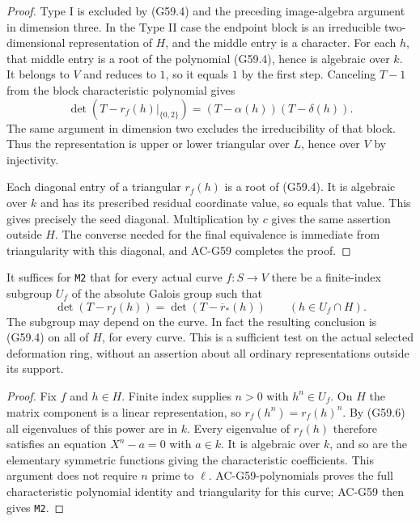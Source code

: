 \begin{proof}
Type I is excluded by (G59.4) and the preceding
image-algebra argument in dimension three.
In the Type II case the endpoint block is an
irreducible two-dimensional representation of \(H\),
and the middle entry is a character.
For each \(h\), that middle entry is a root of the
polynomial (G59.4), hence is algebraic over \(k\).
It belongs to \(V\) and reduces to \(1\), so it equals
\(1\) by the first step.
Canceling \(T-1\) from the block characteristic
polynomial gives
\[
       \det(T-r_f(h)|_{\{0,2\}})
                       =(T-\alpha(h))(T-\delta(h)).
                                                               \tag{G59.5}
\]
The same argument in dimension two excludes the
irreducibility of that block.
Thus the representation is upper or lower triangular
over \(L\), hence over \(V\) by injectivity.

Each diagonal entry of a triangular \(r_f(h)\) is
a root of (G59.4).
It is algebraic over \(k\) and has its prescribed
residual coordinate value, so equals that value.
This gives precisely the seed diagonal.
Multiplication by \(c\) gives the same assertion
outside \(H\).
The converse needed for the final equivalence is
immediate from triangularity with this diagonal,
and AC-G59 completes the proof.
\end{proof}

\begin{corollary}
\label{AC-G59-finite-index}
It suffices for \texttt{M2} that for every actual curve
\(f:S\to V\) there be a finite-index subgroup
\(U_f\) of the absolute Galois group such that
\[
 \det(T-r_f(h))=\det(T-\overline r_*(h))
                         \qquad(h\in U_f\cap H).
                                                               \tag{G59.6}
\]
The subgroup may depend on the curve.
In fact the resulting conclusion is (G59.4) on all
of \(H\), for every curve.
This is a sufficient test on the actual selected
deformation ring, without an assertion about all
ordinary representations outside its support.
\end{corollary}
\begin{proof}
Fix \(f\) and \(h\in H\).
Finite index supplies \(n>0\) with \(h^n\in U_f\).
On \(H\) the matrix component is a linear
representation, so \(r_f(h^n)=r_f(h)^n\).
By (G59.6) all eigenvalues of this power are in \(k\).
Every eigenvalue of \(r_f(h)\) therefore satisfies
an equation \(X^n-a=0\) with \(a\in k\).
It is algebraic over \(k\), and so are the elementary
symmetric functions giving the characteristic
coefficients.
This argument does not require \(n\) prime to
\(\ell\).
AC-G59-polynomials proves the full characteristic
polynomial identity and triangularity for this
curve; AC-G59 then gives \texttt{M2}.
\end{proof}

